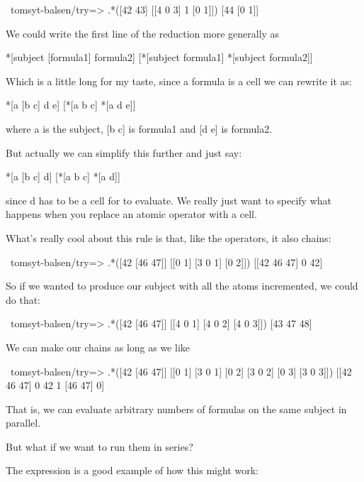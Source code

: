 \begin{code}
~tomsyt-balsen/try=> .*([42 43] [[4 0 3] 1 [0 1]])
[44 [0 1]]
\end{code}
We could write the first line of the reduction more generally as  

\begin{code}
*[subject [formula1] formula2]     [*[subject formula1] *[subject formula2]]   
\end{code}
Which is a little long for my taste, since a formula is a cell we can rewrite it as:

\begin{code}
*[a [b c] d e]     [*[a b c] *[a d e]]   
\end{code}
where a is the subject, [b c] is formula1 and [d e] is formula2.

But actually we can simplify this further and just say:

\begin{code}
*[a [b c] d]     [*[a b c] *[a d]]   
\end{code}
since d has to be a cell for \kode{*[a d]} to evaluate. We really just want to
specify what happens when you replace an atomic operator with a cell.

What's really cool about this rule is that, like the operators, it also chains:

\begin{code}
~tomsyt-balsen/try=> .*([42 [46 47]] [[0 1] [3 0 1] [0 2]])
[[42 46 47] 0 42]
\end{code}
So if we wanted to produce our subject with all the atoms incremented, we could
do that:

\begin{code}
~tomsyt-balsen/try=> .*([42 [46 47]] [[4 0 1] [4 0 2] [4 0 3]])
[43 47 48]
\end{code}
We can make our chains as long as we like

\begin{code}
~tomsyt-balsen/try=> .*([42 [46 47]] [[0 1] [3 0 1] [0 2] [3 0 2] [0 3] [3 0 3]])
[[42 46 47] 0 42 1 [46 47] 0]
\end{code}

That is, we can evaluate arbitrary numbers of formulas on the same subject in
parallel.

But what if we want to run them in series? 

The expression \kode{*[[42 43] [[4 0 3] 1 [0 1]]]} is a good example of how this might work:

